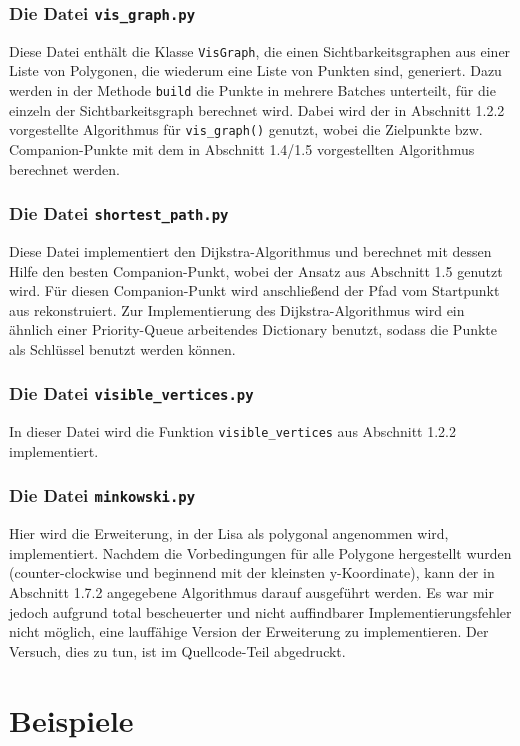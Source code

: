 \documentclass[a4paper, notitlepage, 12pt]{scrartcl}
\begin{document}
\subsubsection{Die Datei \texttt{vis\_graph.py}}
Diese Datei enthält die Klasse \texttt{VisGraph}, die einen Sichtbarkeitsgraphen aus einer Liste von Polygonen, die wiederum eine Liste von Punkten sind, generiert. Dazu werden in der Methode \texttt{build} die Punkte in mehrere Batches unterteilt, für die einzeln der Sichtbarkeitsgraph berechnet wird. Dabei wird der in Abschnitt 1.2.2 vorgestellte Algorithmus für \texttt{vis\_graph()} genutzt, wobei die Zielpunkte bzw. Companion-Punkte mit dem in Abschnitt 1.4/1.5 vorgestellten Algorithmus berechnet werden.
\subsubsection{Die Datei \texttt{shortest\_path.py}}
Diese Datei implementiert den Dijkstra-Algorithmus und berechnet mit dessen Hilfe den besten Companion-Punkt, wobei der Ansatz aus Abschnitt 1.5 genutzt wird. Für diesen Companion-Punkt wird anschließend der Pfad vom Startpunkt aus rekonstruiert. Zur Implementierung des Dijkstra-Algorithmus wird ein ähnlich einer Priority-Queue arbeitendes Dictionary benutzt, sodass die Punkte als Schlüssel benutzt werden können.
\subsubsection{Die Datei \texttt{visible\_vertices.py}}
In dieser Datei wird die Funktion \texttt{visible\_vertices} aus Abschnitt 1.2.2 implementiert.
\subsubsection{Die Datei \texttt{minkowski.py}}
Hier wird die Erweiterung, in der Lisa als polygonal angenommen wird, implementiert. Nachdem die Vorbedingungen für alle Polygone hergestellt wurden (counter-clockwise und beginnend mit der kleinsten y-Koordinate), kann der in Abschnitt 1.7.2 angegebene Algorithmus darauf ausgeführt werden. Es war mir jedoch aufgrund total bescheuerter und nicht auffindbarer Implementierungsfehler nicht möglich, eine lauffähige Version der Erweiterung zu implementieren. Der Versuch, dies zu tun, ist im Quellcode-Teil abgedruckt.
\section{Beispiele}
\end{document}
